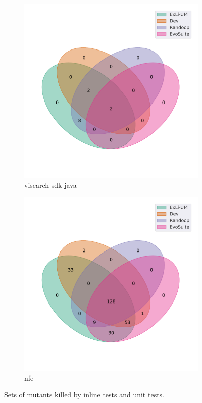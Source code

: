 \begin{figure}[t]\ContinuedFloat
\begin{subfigure}[b]{0.45\textwidth}
\includegraphics[width=\textwidth]{figures/venn/visenze_visearch-sdk-java-venn.pdf}
\vspace{-10pt}
\caption{visearch-sdk-java}
\label{fig:venn-visenze_visearch-sdk-java}
\end{subfigure}
\hfill
\begin{subfigure}[b]{0.45\textwidth}
\includegraphics[width=\textwidth]{figures/venn/wmixvideo_nfe-venn.pdf}
\vspace{-10pt}
\caption{nfe}
\label{fig:venn-wmixvideo_nfe}
\end{subfigure}
\caption{Sets of mutants killed by inline tests and unit tests.}
\label{fig:venn-all}
\end{figure}